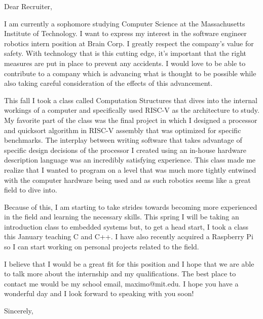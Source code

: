 \documentclass[12pt]{letter}
\begin{document}
\begin{letter}{}
    \opening{Dear Recruiter,}
    I am currently a sophomore studying Computer Science at the Massachusetts Institute of Technology.
    I want to express my interest in the software engineer robotics intern position at Brain Corp.
    I greatly respect the company's value for safety. With technology that is this cutting edge, it's important that the right measures are put in place to prevent any accidents.
    I would love to be able to contribute to a company which is advancing what is thought to be possible while also taking careful consideration of the effects of this advancement.

    This fall I took a class called Computation Structures that dives into the internal workings of a computer and specifically used RISC-V as the architecture to study.
    My favorite part of the class was the final project in which I designed a processor and quicksort algorithm in RISC-V assembly that was optimized for specific benchmarks.
    The interplay between writing software that takes advantage of specific design decisions of the processor I created using an in-house hardware description language was an incredibly satisfying experience.
    This class made me realize that I wanted to program on a level that was much more tightly entwined with the computer hardware being used and as such robotics seems like a great field to dive into.

    Because of this, I am starting to take strides towards becoming more experienced in the field and learning the necessary skills.
    This spring I will be taking an introduction class to embedded systems but, to get a head start, I took a class this January teaching C and C++.
    I have also recently acquired a Raspberry Pi so I can start working on personal projects related to the field.

    I believe that I would be a great fit for this position and I hope that we are able to talk more about the internship and my qualifications.
    The best place to contact me would be my school email, maximo@mit.edu. I hope you have a wonderful day and I look forward to speaking with you soon!
    \closing{Sincerely,}
\end{letter}
\end{document}
